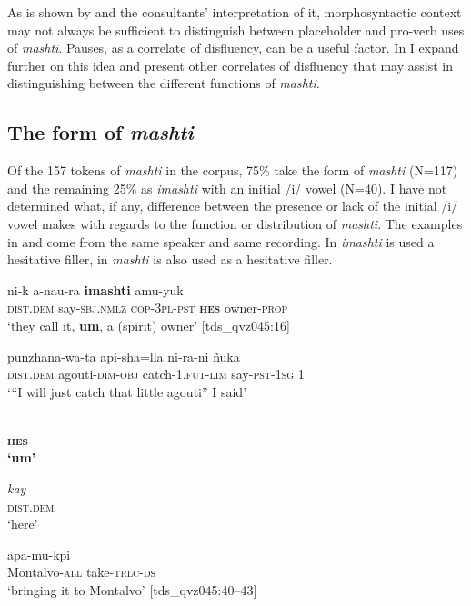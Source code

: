 \documentclass[output=paper]{langscibook}
\begin{document}
As is shown by  and the consultants’ interpretation of it, morphosyntactic context may not always be sufficient to distinguish between placeholder and pro-verb uses of \textit{mashti}. Pauses, as a correlate of disfluency, can be a useful factor. In  I expand further on this idea and present other correlates of disfluency that may assist in distinguishing between the different functions of \textit{mashti}.

\largerpage
\subsection{The form of \textit{mashti}}
\label{sec:rice:3.4}
Of the 157 tokens of \textit{mashti} in the corpus, 75\% take the form of \textit{mashti} (N=117) and the remaining 25\% as \textit{imashti} with an initial /i/ vowel (N=40). I have not determined what, if any, difference between the presence or lack of the initial /i/ vowel makes with regards to the function or distribution of \textit{mashti}. The examples in  and  come from the same speaker and same recording. In  \textit{imashti} is used a hesitative filler, in  \textit{mashti} is also used as a hesitative filler.

\ea%
\label{ex:rice:17}
 {ni-k} {a-nau-ra} {\textbf{imashti}} {amu-yuk}\\
{\textsc{dist.dem}} {say-\textsc{sbj.nmlz}} {\textsc{cop-3pl-pst}}  {\textbf{\textsc{hes}}} {owner-\textsc{prop}}\\
\glt ‘they call it, \textbf{um}, a (spirit) owner’ [tds\_qvz045:16]
\z


\ea%
\label{ex:rice:18}
\ea \label{ex:rice:18a} 
 {punzhana-wa-ta} {api-sha=lla} {ni-ra-ni} {ñuka}\\
{\textsc{dist.dem}} {agouti-\textsc{dim-obj}} {catch-\textsc{1.fut-lim}}  {say\textsc{{}-pst-1sg}}  {1}\\
\glt   ‘“I will just catch that little agouti” I said’
\medskip

\ex \label{ex:rice:18b}
\\
\textbf{\textsc{hes}}\\
\glt \textbf{‘um’}
\medskip

\ex \label{ex:rice:18c} {\textit{kay}}\\
{\textsc{dist.dem}}\\
\glt ‘here’
\medskip

\ex \label{ex:rice:18d}
 {apa-mu-kpi}\\
{Montalvo-\textsc{all}}  {take\textsc{{}-trlc-ds}}\\
\glt ‘bringing it to Montalvo’ [tds\_qvz045:40--43]
\z
\z
\end{document}
